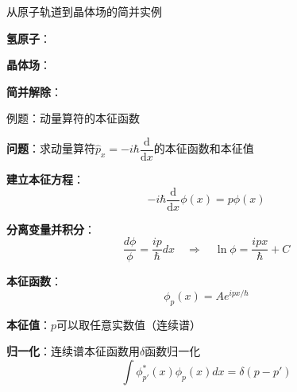 \begin{frame}{从原子轨道到晶体场的简并实例}
  
    \begin{iqbitemize}
    \item \textbf{氢原子}：
    \item \textbf{晶体场}：
    \item \textbf{简并解除}：
    \end{iqbitemize}
    \iqbtinysep

  

\end{frame}

\begin{frame}{例题：动量算符的本征函数}

  \textbf{问题}：求动量算符$\hat{p}_x = -i\hbar\dfrac{\mathrm{d}}{\mathrm{d}x}$的本征函数和本征值

  \begin{iqbitemize}
    \item \textbf{建立本征方程}：
    \[
      -i\hbar\dfrac{\mathrm{d}}{\mathrm{d}x}\phi(x) = p\phi(x)
    \]

    \item \textbf{分离变量并积分}：
    \[
      \dfrac{d\phi}{\phi} = \dfrac{i p}{\hbar}dx \quad \Rightarrow \quad \ln\phi = \dfrac{ipx}{\hbar} + C
    \]

    \item \textbf{本征函数}：
    \[
      \phi_p(x) = A e^{ipx/\hbar}
    \]

    \item \textbf{本征值}：$p$可以取任意实数值（连续谱）

    \item \textbf{归一化}：连续谱本征函数用$\delta$函数归一化
    \[
      \int \phi_{p'}^*(x)\phi_p(x)dx = \delta(p-p')
    \]
  \end{iqbitemize}
\end{frame}
